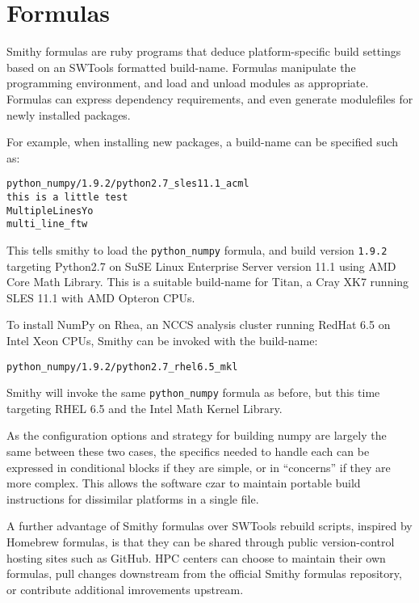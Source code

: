 \documentclass{acm_proc_article-sp}
\begin{document}
\section{Formulas}

Smithy formulas are ruby programs that deduce platform-specific build settings
based on an SWTools formatted build-name. Formulas manipulate the programming
environment, and load and unload modules as appropriate. Formulas can express
dependency requirements, and even generate modulefiles for newly installed
packages.

For example, when installing new packages, a build-name can be specified such
as:

\begin{quoting}
\begin{verbatim}
python_numpy/1.9.2/python2.7_sles11.1_acml
this is a little test
MultipleLinesYo
multi_line_ftw
\end{verbatim}
\end{quoting}

This tells smithy to load the \texttt{python\_numpy} formula, and build version
\texttt{1.9.2} targeting Python2.7 on SuSE Linux Enterprise Server version 11.1
using AMD Core Math Library. This is a suitable build-name for Titan, a Cray XK7
running SLES 11.1 with AMD Opteron CPUs.

To install NumPy on Rhea, an NCCS analysis cluster running RedHat 6.5 on Intel
Xeon CPUs, Smithy can be invoked with the build-name:

\begin{quoting}
\begin{verbatim}
python_numpy/1.9.2/python2.7_rhel6.5_mkl
\end{verbatim}
\end{quoting}

Smithy will invoke the
same \texttt{python\_numpy} formula as before, but this time targeting RHEL 6.5
and the Intel Math Kernel Library.

As the configuration options and strategy for building numpy are largely the
same between these two cases, the specifics needed to handle each can be
expressed in conditional blocks if they are simple, or in ``concerns'' if they
are more complex. This allows the software czar to maintain portable build
instructions for dissimilar platforms in a single file.

A further advantage of Smithy formulas over SWTools rebuild scripts, inspired by
Homebrew formulas, is that they can be shared through public version-control
hosting sites such as GitHub. HPC centers can choose to maintain their own
formulas, pull changes downstream from the official Smithy formulas repository,
or contribute additional imrovements upstream.
\end{document}
